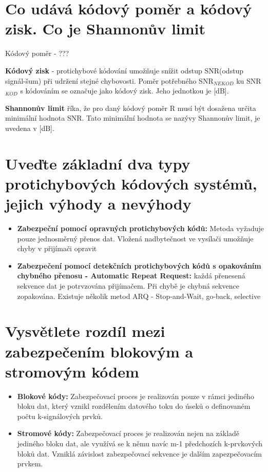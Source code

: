 \section{Co udává kódový poměr a kódový zisk. Co je Shannonův limit}
Kódový poměr - ???

\textbf{Kódový zisk} - protichybové kódování umožňuje snížit odstup SNR(odstup signál-šum) při udržení stejné chybovosti.
Poměr potřebného SNR$_{NEKOD}$ ku SNR$_{KOD}$ s kódováním se označuje jako kódový zisk. 
Jeho jednotkou je [dB].

\textbf{Shannonův limit} říka, že pro daný kódový poměr R musí být dosažena určita minimální hodnota SNR.
Tato minimální hodnota se nazývy Shannonův limit, je uvedena v [dB].

\section{Uveďte základní dva typy protichybových kódových systémů, jejich výhody a nevýhody}
\begin{itemize}
    \item \textbf{Zabezpeční pomocí opravných protichybových kódů:} Metoda vyžaduje pouze jednosměrný přenos dat.
    Vložená nadbytečnost ve vysílači umožňuje chyby v přijímači opravit
    \item \textbf{Zabezpečení pomocí detekčních protichybových kódů s opakováním chybného přenosu - Automatic Repeat Request: }každá přenesená sekvence dat je potrvzována přijímačem.
    Při chybě je chybná sekvence zopakována.
    Existuje několik metod ARQ - Stop-and-Wait, go-back, selective
\end{itemize}
\section{Vysvětlete rozdíl mezi zabezpečením blokovým a stromovým kódem}
\begin{itemize}
    \item \textbf{Blokové kódy:} Zabezpečovací proces je realizován pouze v rámci jediného bloku dat, který vznikl rozdělením datového toku do úseků o definovaném počtu k-signálových prvků.
    \item \textbf{Stromové kódy: }Zabezpečovací proces je realizován nejen na základě jediného bloku dat, ale využívá se k němu navíc m-1 předchozích k-prvkových bloků dat.
    Vzniklá závislost zabezpečovací sekvence je dalším zapezpečovacím prvkem.
\end{itemize}

